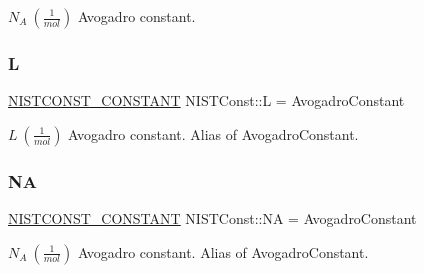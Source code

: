 $N_A \ (\frac{1}{mol})$ Avogadro constant. \mbox{\label{group___n_i_s_t_const-_avogadro_constant_ga700bcbfac3a5c4488d22ba4162f0fe92}} 
\subsubsection{\texorpdfstring{L}{L}}
{\footnotesize\ttfamily \mbox{\hyperlink{group___n_i_s_t_const-_macros_ga2b0fc1d7452373f816175dd86ce26729}{N\+I\+S\+T\+C\+O\+N\+S\+T\+\_\+\+C\+O\+N\+S\+T\+A\+NT}} N\+I\+S\+T\+Const\+::L = Avogadro\+Constant}

$L \ (\frac{1}{mol})$ Avogadro constant. Alias of Avogadro\+Constant. \mbox{\label{group___n_i_s_t_const-_avogadro_constant_ga50ccb698ff867244ec9b249af513abff}} 
\subsubsection{\texorpdfstring{NA}{NA}}
{\footnotesize\ttfamily \mbox{\hyperlink{group___n_i_s_t_const-_macros_ga2b0fc1d7452373f816175dd86ce26729}{N\+I\+S\+T\+C\+O\+N\+S\+T\+\_\+\+C\+O\+N\+S\+T\+A\+NT}} N\+I\+S\+T\+Const\+::\+NA = Avogadro\+Constant}

$N_A \ (\frac{1}{mol})$ Avogadro constant. Alias of Avogadro\+Constant. 
